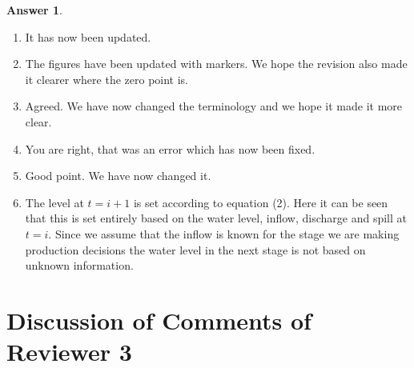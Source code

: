 \documentclass{article}
\theoremstyle{definition}
\newtheorem*{answer}{Answer}
\newcounter{commentCounter}
\begin{document}
{\begin{answer}
\begin{enumerate}
\textcolor{blue}{Note that this implies that the main objective of the medium-term reservoir management problem is to estimate the future value function, and, therefore, finding an implementable policy may not be necessary. As a result, the requirement that the optimization method must yield an implementable policy can be relaxed while still making the method useful for supporting short-term decision-making.} 
\item It has now been updated. 
\item The figures have been updated with markers. We hope the revision also made it clearer where the zero point is.

\item Agreed. We have now changed the terminology and we hope it made it more clear.

\item You are right, that was an error which has now been fixed. 
\item Good point. We have now changed it.
\item The level at $t=i+1$ is set according to equation (2). Here it can be seen that this is set entirely based on the water level, inflow, discharge and spill at $t=i$. Since we assume that the inflow is known for the stage we are making production decisions the water level in the next stage is not based on unknown information. 

\end{enumerate}
\end{answer}

\newpage
\section*{Discussion of Comments of Reviewer 3}
\setcounter{commentCounter}{1}


}
\end{document}

